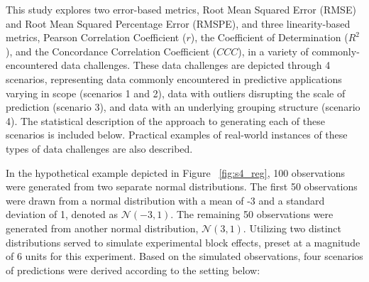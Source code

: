 This study explores two error-based metrics, Root Mean Squared Error (RMSE) and Root Mean Squared Percentage Error (RMSPE), and three linearity-based metrics, 
Pearson Correlation Coefficient ($r$), the Coefficient of Determination ($R^2$), and the Concordance Correlation Coefficient ($CCC$), in a variety of commonly-encountered data challenges. These data challenges are depicted through 4 scenarios, representing data commonly encountered in predictive applications varying in scope (scenarios 1 and 2), data with outliers disrupting the scale of prediction (scenario 3), and data with an underlying grouping structure (scenario 4). The statistical description of the approach to generating each of these scenarios is included below. Practical examples of real-world instances of these types of data challenges are also described.

In the hypothetical example depicted in Figure ~\ref{fig:s4_reg}, 100 observations were generated from two separate normal distributions. The first 50 observations were drawn from a normal distribution with a mean of -3 and a standard deviation of 1, denoted as $\mathcal{N}(-3, 1)$. The remaining 50 observations were generated from another normal distribution, $\mathcal{N}(3, 1)$. Utilizing two distinct distributions served to simulate experimental block effects, preset at a magnitude of 6 units for this experiment. Based on the simulated observations, four scenarios of predictions were derived according to the setting below:

